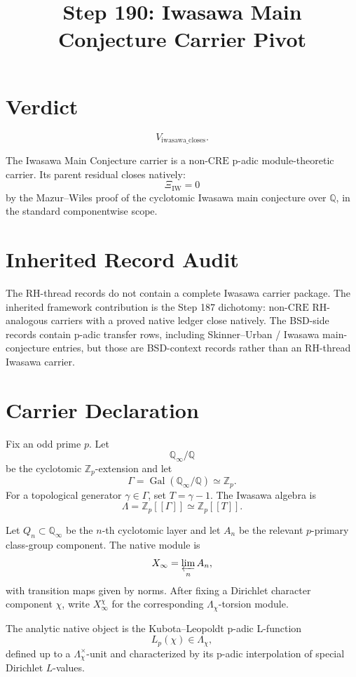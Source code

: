 \documentclass[11pt]{article}
\title{Step 190: Iwasawa Main Conjecture Carrier Pivot}
\date{}
\newcommand{\Q}{\mathbb Q}
\newcommand{\Zp}{\mathbb Z_p}
\newcommand{\LambdaIW}{\Lambda}
\newcommand{\XiIW}{\Xi_{\mathrm{IW}}}
\newcommand{\Gal}{\operatorname{Gal}}
\newcommand{\CRE}{\mathrm{CRE}}
\begin{document}
\maketitle

\section*{Verdict}

\[
V_{\mathrm{iwasawa\_closes}}.
\]

The Iwasawa Main Conjecture carrier is a non-\(\CRE\) p-adic module-theoretic carrier.  Its parent residual closes natively:
\[
\XiIW=0
\]
by the Mazur--Wiles proof of the cyclotomic Iwasawa main conjecture over \(\Q\), in the standard componentwise scope.

\section*{Inherited Record Audit}

The RH-thread records do not contain a complete Iwasawa carrier package.  The inherited framework contribution is the Step 187 dichotomy: non-\(\CRE\) RH-analogous carriers with a proved native ledger close natively.  The BSD-side records contain p-adic transfer rows, including Skinner--Urban / Iwasawa main-conjecture entries, but those are BSD-context records rather than an RH-thread Iwasawa carrier.

\section*{Carrier Declaration}

Fix an odd prime \(p\).  Let
\[
\Q_\infty/\Q
\]
be the cyclotomic \(\Zp\)-extension and let
\[
\Gamma=\Gal(\Q_\infty/\Q)\simeq \Zp.
\]
For a topological generator \(\gamma\in\Gamma\), set \(T=\gamma-1\).  The Iwasawa algebra is
\[
\LambdaIW=\Zp[[\Gamma]]\simeq \Zp[[T]].
\]

Let \(Q_n\subset \Q_\infty\) be the \(n\)-th cyclotomic layer and let \(A_n\) be the relevant \(p\)-primary class-group component.  The native module is
\[
X_\infty=\varprojlim_n A_n,
\]
with transition maps given by norms.  After fixing a Dirichlet character component \(\chi\), write \(X_\infty^\chi\) for the corresponding \(\Lambda_\chi\)-torsion module.

The analytic native object is the Kubota--Leopoldt p-adic L-function
\[
L_p(\chi)\in \Lambda_\chi,
\]
defined up to a \(\Lambda_\chi^\times\)-unit and characterized by its p-adic interpolation of special Dirichlet \(L\)-values.
\end{document}
